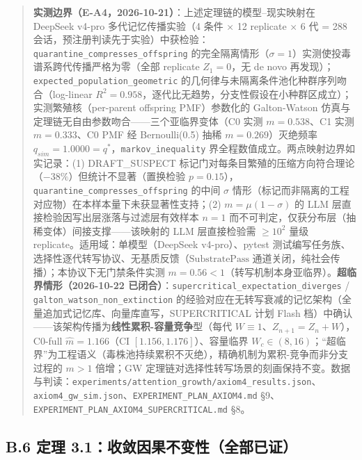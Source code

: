 \begin{quote}
\textbf{实测边界（E-A4，2026-10-21）}：上述定理链的模型--现实映射在
DeepSeek v4-pro 多代记忆传播实验（4 条件 × 12 replicate × 6 代 = 288
会话，预注册判读先于实验）中获检验：\texttt{quarantine\_compresses\_offspring}
的完全隔离情形（\(\sigma=1\)）实测使投毒谱系跨代传播严格为零（全部
replicate \(Z_1=0\)，无 de novo
再发现）；\texttt{expected\_population\_geometric}
的几何律与未隔离条件池化种群序列吻合（log-linear
\(R^2=0.958\)，逐代比无趋势，分支性假设在小种群区成立）；实测繁殖核（per-parent
offspring PMF）参数化的 Galton-Watson
仿真与定理链无自由参数吻合------三个亚临界变体（C0 实测 \(m=0.538\)、C1
实测 \(m=0.333\)、C0 PMF 经 Bernoulli(0.5) 抽稀 \(m=0.269\)）灭绝频率
\(q_{sim}=1.0000=q^*\)，\texttt{markov\_inequality}
界全程数值成立。两点映射边界如实记录：(1) DRAFT\_SUSPECT
标记门对每条目繁殖的压缩方向符合理论（\(-38\%\)）但统计不显著（置换检验
\(p=0.15\)），\texttt{quarantine\_compresses\_offspring} 的中间
\(\sigma\)
情形（标记而非隔离的工程对应物）在本样本量下未获显著性支持；(2)
\(m=\mu(1-\sigma)\) 的 LLM 层直接检验因写出层涨落与过滤层有效样本
\(n=1\) 而不可判定，仅获分布层（抽稀变体）间接支撑------该映射的 LLM
层直接检验需 \(\ge 10^2\) 量级 replicate。适用域：单模型（DeepSeek
v4-pro）、pytest
测试编写任务族、选择性逐代转写协议、无基质反馈（\(\mathrm{SubstratePass}\)
通道关闭，纯社会传播）；本协议下无门禁条件实测
\(m=0.56<1\)（转写机制本身亚临界）。\textbf{超临界情形（2026-10-22
已闭合）}：\texttt{supercritical\_expectation\_diverges} /
\texttt{galton\_watson\_non\_extinction}
的经验对应在无转写衰减的记忆架构（全量追加式记忆库、向量库直写，SUPERCRITICAL
计划 Flash
档）中确认------该架构传播为\textbf{线性累积-容量竞争}型（每代
\(W\equiv1\)、\(Z_{n+1}=Z_n+W\)），C0-full \(\hat m=1.166\)（CI
\([1.156,1.176]\)）、容量临界
\(W_c\in(8,16)\)；``超临界''为工程语义（毒株池持续累积不灭绝），精确机制为累积-竞争而非分支过程的
\(m>1\) 倍增；GW
定理链对选择性转写场景的刻画保持不变。数据与判读：\texttt{experiments/attention\_growth/axiom4\_results.json}、\texttt{axiom4\_gw\_sim.json}、\texttt{EXPERIMENT\_PLAN\_AXIOM4.md}
§9、\texttt{EXPERIMENT\_PLAN\_AXIOM4\_SUPERCRITICAL.md} §8。
\end{quote}

\subsection{B.6 定理
3.1：收敛因果不变性（全部已证）}\label{b.6-ux5b9aux7406-3.1ux6536ux655bux56e0ux679cux4e0dux53d8ux6027ux5168ux90e8ux5df2ux8bc1}

